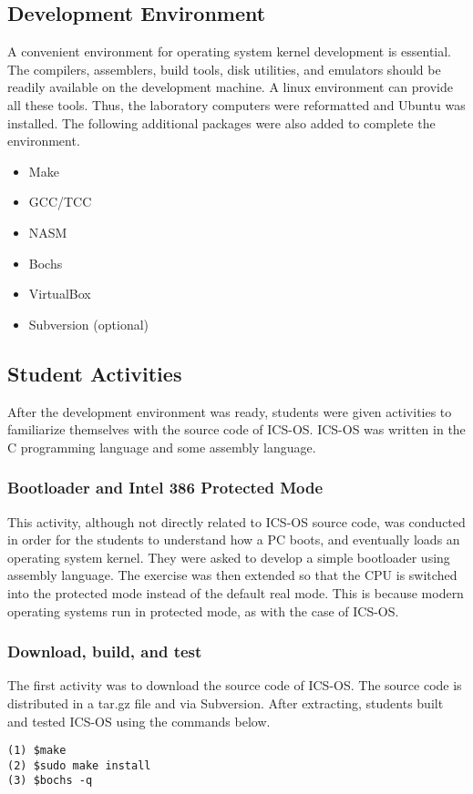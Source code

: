 \documentclass{acm_proc_article-sp}
\begin{document}
\subsection{Development Environment}
A convenient environment for operating system kernel development is essential.
The compilers, assemblers, build tools, disk utilities, and emulators should
be readily available on the development machine. A linux environment can 
provide all these tools. Thus, the laboratory computers were reformatted and
Ubuntu was installed. The following additional packages were also added to 
complete the environment.
\begin{itemize}
 \item Make
 \item GCC/TCC
 \item NASM
 \item Bochs
 \item VirtualBox
 \item Subversion (optional)
\end{itemize}

\subsection{Student Activities}
After the development environment was ready, students were given activities
to familiarize themselves with the source code of ICS-OS. ICS-OS was written
in the C programming language and some assembly language.

\subsubsection{Bootloader and Intel 386 Protected Mode}
This activity, although not directly related to ICS-OS source code, was 
conducted in order for the students to understand how a PC boots, and 
eventually loads an operating system kernel. They were asked to develop a
simple bootloader using assembly language. The exercise was then extended so
that the CPU is switched into the protected mode instead of the default 
real mode. This is because modern operating systems run in protected mode, 
as with the case of ICS-OS.

\subsubsection{Download, build, and test}
The first activity was to download the source code of ICS-OS\cite{icsos:site}.
The source code is distributed in a tar.gz file and via Subversion. 
After extracting, students built and tested ICS-OS using the commands below.
\begin{verbatim}
(1) $make
(2) $sudo make install
(3) $bochs -q
\end{verbatim}
\end{document}
